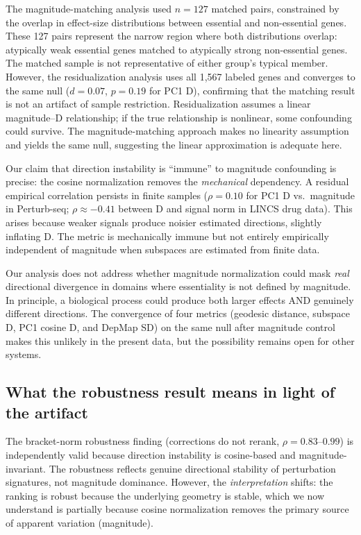 \documentclass[11pt]{article}
\begin{document}
The magnitude-matching analysis used $n = 127$ matched pairs,
constrained by the overlap in effect-size distributions between
essential and non-essential genes. These 127 pairs represent the narrow
region where both distributions overlap: atypically weak essential genes
matched to atypically strong non-essential genes. The matched sample is
not representative of either group's typical member. However, the
residualization analysis uses all 1{,}567 labeled genes and converges to
the same null ($d = 0.07$, $p = 0.19$ for PC1 D), confirming that the
matching result is not an artifact of sample restriction. Residualization
assumes a linear magnitude--D relationship; if the true relationship is
nonlinear, some confounding could survive. The magnitude-matching
approach makes no linearity assumption and yields the same null,
suggesting the linear approximation is adequate here.

Our claim that direction instability is ``immune'' to magnitude
confounding is precise: the cosine normalization removes the
\emph{mechanical} dependency. A residual empirical correlation persists
in finite samples ($\rho = 0.10$ for PC1 D vs.\ magnitude in
Perturb-seq; $\rho \approx -0.41$ between D and signal norm in LINCS
drug data). This arises because weaker signals produce noisier estimated
directions, slightly inflating D. The metric is mechanically immune but
not entirely empirically independent of magnitude when subspaces are
estimated from finite data.

Our analysis does not address whether magnitude normalization could mask
\emph{real} directional divergence in domains where essentiality is not
defined by magnitude. In principle, a biological process could produce
both larger effects AND genuinely different directions. The convergence
of four metrics (geodesic distance, subspace D, PC1 cosine D, and DepMap
SD) on the same null after magnitude control makes this unlikely in the
present data, but the possibility remains open for other systems.

\subsection{What the robustness result means in light of the artifact}

The bracket-norm robustness finding (corrections do not rerank, $\rho =
0.83$--$0.99$) is independently valid because direction instability is
cosine-based and magnitude-invariant. The robustness reflects genuine
directional stability of perturbation signatures, not magnitude
dominance. However, the \emph{interpretation} shifts: the ranking is
robust because the underlying geometry is stable, which we now
understand is partially because cosine normalization removes the primary
source of apparent variation (magnitude).
\end{document}
